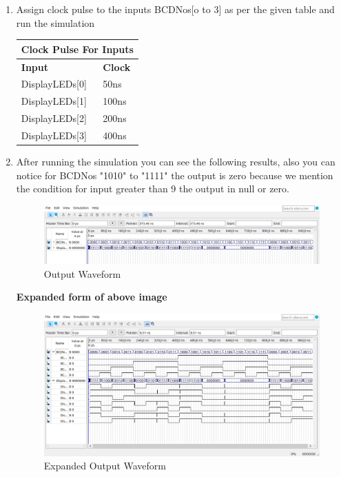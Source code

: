 \documentclass[12pt,singleside,a4paper]{article}
\begin{document}
\begin{enumerate}
    \item   Assign clock pulse to the inputs BCDNos[o to 3] as per the given table          and         run the simulation
            \begin{center}
    \begin{tabular}{ |p{3cm}|p{3cm}| } \hline
 \multicolumn{2}{|c|}{Clock Pulse For Inputs} \\ \hline \hline
\textbf{Input}      &       \textbf{Clock}         \\ \hline
DisplayLEDs[0]      &           50ns     \\\hline
DisplayLEDs[1]      &100ns\\\hline
DisplayLEDs[2]	    &200ns\\\hline
DisplayLEDs[3]      &     400ns  \\\hline

\end{tabular}        
  \end{center}
    \item   After running the simulation you can see the following results, also you can notice         for BCDNos "1010" to "1111" the output is zero because we mention the condition for         input greater than 9 the output in null or zero.
    
            \begin{figure}[H]
            \centering
            \includegraphics[width=14cm,keepaspectratio]{Simulation/Simulation5.png}
            \caption{Output Waveform}
            \end{figure}
            \newpage
            \textbf{Expanded form of above image}
            \begin{figure}[H]
            \centering
            \includegraphics[width=14cm,keepaspectratio]{Simulation/Simulation6.png}
            \caption{Expanded Output Waveform}
            \end{figure}
            
    
\end{enumerate}
  
\end{document}
